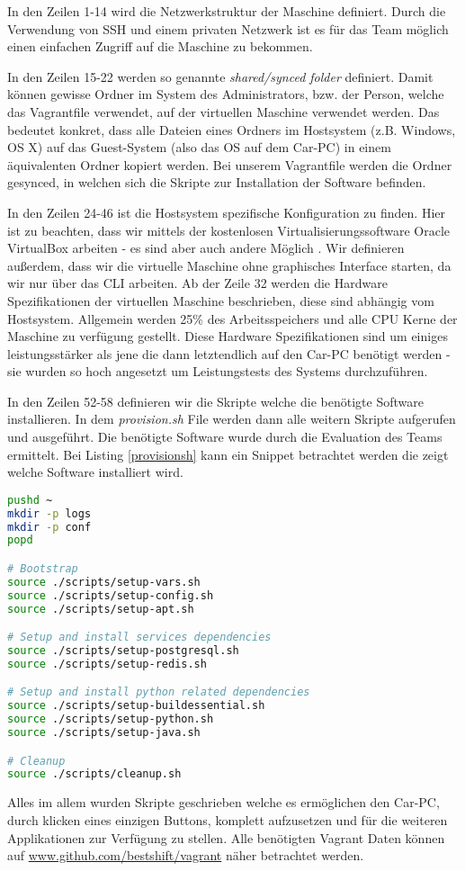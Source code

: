 In den Zeilen 1-14 wird die Netzwerkstruktur der Maschine definiert. Durch die Verwendung von SSH \cite{MELD.CH3-ssh.website} und einem privaten Netzwerk ist es für das Team möglich einen einfachen Zugriff auf die Maschine zu bekommen.

In den Zeilen 15-22 werden so genannte \textit{shared/synced folder} \cite{MELD.CH3-vagrant.syncedFolders} definiert. Damit können gewisse Ordner im System des Administrators, bzw. der Person, welche das Vagrantfile verwendet, auf der virtuellen Maschine verwendet werden. Das bedeutet konkret, dass alle Dateien eines Ordners im Hostsystem (z.B. Windows, OS X) auf das Guest-System (also das OS auf dem Car-PC) in einem äquivalenten Ordner kopiert werden. Bei unserem Vagrantfile werden die Ordner gesynced, in welchen sich die Skripte zur Installation der Software befinden.

In den Zeilen 24-46 ist die Hostsystem spezifische Konfiguration zu finden. Hier ist zu beachten, dass wir mittels der kostenlosen Virtualisierungssoftware Oracle VirtualBox \cite{MELD.CH3-virtualbox.website} arbeiten - es sind aber auch andere Möglich \cite{MELD.CH3-vagrant.providers}. Wir definieren außerdem, dass wir die virtuelle Maschine ohne graphisches Interface starten, da wir nur über das CLI arbeiten. Ab der Zeile 32 werden die Hardware Spezifikationen der virtuellen Maschine beschrieben, diese sind abhängig vom Hostsystem. Allgemein werden 25\% des Arbeitsspeichers und alle CPU Kerne der Maschine zu verfügung gestellt. Diese Hardware Spezifikationen sind um einiges leistungsstärker als jene die dann letztendlich auf den Car-PC benötigt werden - sie wurden so hoch angesetzt um Leistungstests des Systems durchzuführen.

In den Zeilen 52-58 definieren wir die Skripte welche die benötigte Software installieren. In dem \textit{provision.sh} File werden dann alle weitern Skripte aufgerufen und ausgeführt. Die benötigte Software wurde durch die Evaluation des Teams ermittelt. Bei Listing \ref{provisionsh} kann ein Snippet betrachtet werden die zeigt welche Software installiert wird.

\clearpage

\begin{lstlisting}[language=bash, caption=provision.sh,label={provisionsh}]
pushd ~
mkdir -p logs
mkdir -p conf
popd

# Bootstrap
source ./scripts/setup-vars.sh
source ./scripts/setup-config.sh
source ./scripts/setup-apt.sh

# Setup and install services dependencies
source ./scripts/setup-postgresql.sh
source ./scripts/setup-redis.sh

# Setup and install python related dependencies
source ./scripts/setup-buildessential.sh
source ./scripts/setup-python.sh
source ./scripts/setup-java.sh

# Cleanup
source ./scripts/cleanup.sh
\end{lstlisting}

Alles im allem wurden Skripte geschrieben welche es ermöglichen den Car-PC, durch klicken eines einzigen Buttons, komplett aufzusetzen und für die weiteren Applikationen zur Verfügung zu stellen. Alle benötigten Vagrant Daten können auf \url{www.github.com/bestshift/vagrant} näher betrachtet werden.